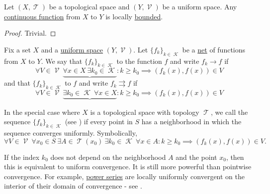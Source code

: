 \begin{proposition}\label{thm:continuous_implies_locally_bounded}
  Let \( (X, \mscrT) \) be a topological space and \( (Y, \mscrV) \) be a uniform space. Any \hyperref[thm:uniform_space_local_convergence/topological_source]{continuous function} from \( X \) to \( Y \) is locally \hyperref[def:bounded_function/locally_bounded]{bounded}.
\end{proposition}
\begin{proof}
  Trivial.
\end{proof}

\begin{definition}\label{def:function_net_convergence}
  Fix a set \( X \) and a \hyperref[def:uniform_space]{uniform space} \( (Y, \mscrV) \). Let \( \{ f_k \}_{k \in \mscrK} \) be a \hyperref[def:topological_net]{net} of functions from \( X \) to \( Y \). We say that \( \{ f_k \}_{k \in \mscrK} \)  to the function \( f \) and write \( f_k \to f \) if
  \begin{equation}\label{def:function_net_convergence/pointwise}
    \forall V \in \mscrV \ \underbrace{\forall x \in X \ \exists k_0 \in \mscrK} : k \geq k_0 \implies (f_k(x), f(x)) \in V
  \end{equation}
  and that \( \{ f_k \}_{k \in \mscrK} \)  to \( f \) and write \( f_k \rightrightarrows f \) if
  \begin{equation}\label{def:function_net_convergence/uniform}
    \forall V \in \mscrV \ \underbrace{\exists k_0 \in \mscrK \ \forall x \in X} : k \geq k_0 \implies (f_k(x), f(x)) \in V
  \end{equation}

  In the special case where \( X \) is a topological space with topology \( \mscrT \), we call the sequence \( \{ f_k \}_{k \in \mscrK} \)  (see \cite{ProofWiki:locally_uniform_convergence}) if every point in \( S \) has a neighborhood in which the sequence converges uniformly. Symbolically,
  \begin{equation}\label{def:function_net_convergence/locally_uniform}
    \forall V \in \mscrV \ \forall x_0 \in S \ \exists A \in \mscrT(x_0) \ \exists k_0 \in \mscrK \ \forall x \in A : k \geq k_0 \implies (f_k(x), f(x)) \in V.
  \end{equation}

  If the index \( k_0 \) does not depend on the neighborhood \( A \) and the point \( x_0 \), then this is equivalent to uniform convergence. It is still more powerful than pointwise convergence. For example, \hyperref[def:convergent_power_series]{power series} are locally uniformly convergent on the interior of their domain of convergence - see .


\end{definition}
